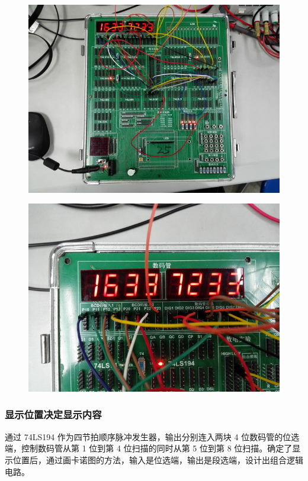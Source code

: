 \documentclass{article}
\begin{document}
\begin{figure}[!hbp]
  \centering
  \includegraphics[scale=0.5]{IMG_20170503_083820.jpg}
\end{figure}

\begin{figure}[!hbp]
  \centering
  \includegraphics[scale=0.5]{IMG_20170503_083821.jpg}
\end{figure}

\newpage

\subsubsection{显示位置决定显示内容}

通过 74LS194 作为四节拍顺序脉冲发生器，输出分别连入两块 4 位数码管的位选端，控制数码管从第 1 位到第 4 位扫描的同时从第 5 位到第 8 位扫描。确定了显示位置后，通过画卡诺图的方法，输入是位选端，输出是段选端，设计出组合逻辑电路。
\end{document}
